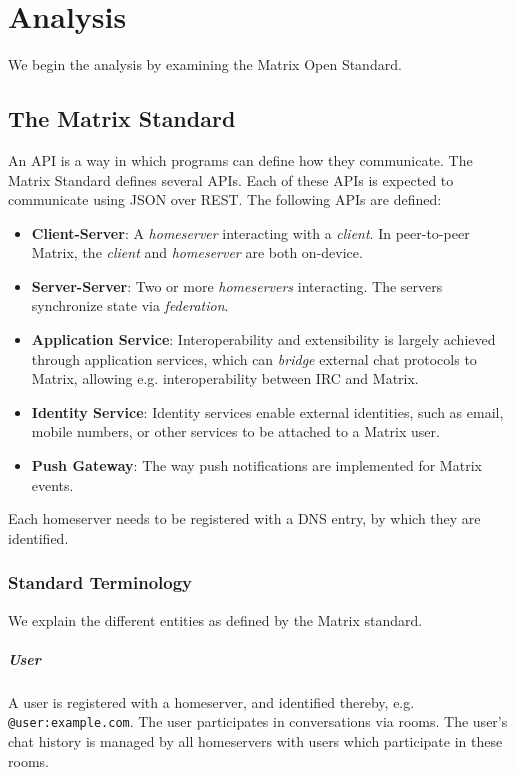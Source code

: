     \chapter{Analysis}
We begin the analysis by examining the Matrix Open Standard.

\section{The Matrix Standard}
An \ac{API} is a way in which programs can define how they communicate.
The Matrix Standard defines several \ac{API}s.
Each of these \ac{API}s is expected to communicate using \ac{JSON} over \ac{REST}.
The following \ac{API}s are defined\cite{matrix_org_spec}:
\begin{itemize}
    \item \textbf{Client-Server}: A \textit{homeserver} interacting with a \textit{client}. In peer-to-peer Matrix, the \textit{client} and \textit{homeserver} are both on-device.
    \item \textbf{Server-Server}: Two or more \textit{homeservers} interacting. The servers synchronize state via \textit{federation}.
    \item \textbf{Application Service}: Interoperability and extensibility is largely achieved through application services, which can \textit{bridge} external chat protocols to Matrix, allowing e.g. interoperability between \ac{IRC} and Matrix.
    \item \textbf{Identity Service}: Identity services enable external identities, such as email, mobile numbers, or other services to be attached to a Matrix user.
    \item \textbf{Push Gateway}: The way push notifications are implemented for Matrix events.
\end{itemize}

Each homeserver needs to be registered with a \ac{DNS} entry, by which they are identified.

\subsection{Standard Terminology}
We explain the different entities as defined by the Matrix standard.

\paragraph{User}
A user is registered with a homeserver, and identified thereby, e.g. \texttt{@user:example.com}.
The user participates in conversations via rooms.
The user's chat history is managed by all homeservers with users which participate in these rooms.

